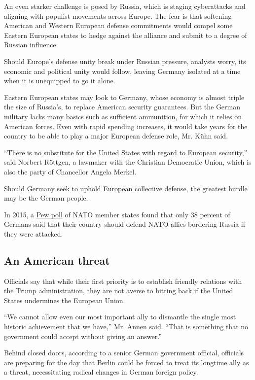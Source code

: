 An even starker challenge is posed by Russia, which is staging
cyberattacks and aligning with populist movements across Europe. The
fear is that softening American and Western European defense commitments
would compel some Eastern European states to hedge against the alliance
and submit to a degree of Russian influence.

Should Europe's defense unity break under Russian pressure, analysts
worry, its economic and political unity would follow, leaving Germany
isolated at a time when it is unequipped to go it alone.

Eastern European states may look to Germany, whose economy is almost
triple the size of Russia's, to replace American security guarantees.
But the German military lacks many basics such as sufficient ammunition,
for which it relies on American forces. Even with rapid spending
increases, it would take years for the country to be able to play a
major European defense role, Mr. Kühn said.

``There is no substitute for the United States with regard to European
security,'' said Norbert Röttgen, a lawmaker with the Christian
Democratic Union, which is also the party of Chancellor Angela Merkel.

Should Germany seek to uphold European collective defense, the greatest
hurdle may be the German people.

In 2015, a
\href{http://www.pewglobal.org/2015/06/10/nato-publics-blame-russia-for-ukrainian-crisis-but-reluctant-to-provide-military-aid/}{Pew
poll} of NATO member states found that only 38 percent of Germans said
that their country should defend NATO allies bordering Russia if they
were attacked.

\hypertarget{an-american-threat}{%
\subsection{An American threat}\label{an-american-threat}}

Officials say that while their first priority is to establish friendly
relations with the Trump administration, they are not averse to hitting
back if the United States undermines the European Union.

``We cannot allow even our most important ally to dismantle the single
most historic achievement that we have,'' Mr. Annen said. ``That is
something that no government could accept without giving an answer.''

Behind closed doors, according to a senior German government official,
officials are preparing for the day that Berlin could be forced to treat
its longtime ally as a threat, necessitating radical changes in German
foreign policy.

